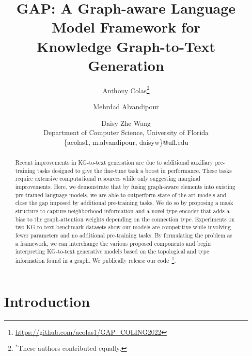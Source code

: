\documentclass[11pt]{article}
\makeatletter
\newcommand{\printfnsymbol}[1]{\textsuperscript{\@fnsymbol{#1}}}
\makeatother
\begin{document}
\title{GAP: A Graph-aware Language Model Framework for\\ Knowledge Graph-to-Text Generation}



\author{Anthony Colas\thanks{$^*$These authors contributed equally.} \and Mehrdad Alvandipour\printfnsymbol{1}\and Daisy Zhe Wang\\
        Department of Computer Science, University of Florida \\
        \{acolas1, m.alvandipour, daisyw\}@ufl.edu}
        




\maketitle
\begin{abstract}
Recent improvements in KG-to-text generation are due to additional auxiliary pre-training tasks designed to give the fine-tune task a boost in performance. These tasks require extensive computational resources while only suggesting marginal improvements. Here, we demonstrate that by fusing graph-aware elements into existing pre-trained language models, we are able to outperform state-of-the-art models and close the gap imposed by additional pre-training tasks. We do so by proposing a mask structure to capture neighborhood information and a novel type encoder that adds a bias to the graph-attention weights depending on the connection type. Experiments on two KG-to-text benchmark datasets show our models are competitive while involving fewer parameters and no additional pre-training tasks. By formulating the problem as a framework, we can interchange the various proposed components and begin interpreting KG-to-text generative models based on the topological and type information found in a graph. We publically release our code~\footnote{ \url{https://github.com/acolas1/GAP\_COLING2022}}.
\end{abstract}

\section{Introduction}
\end{document}
